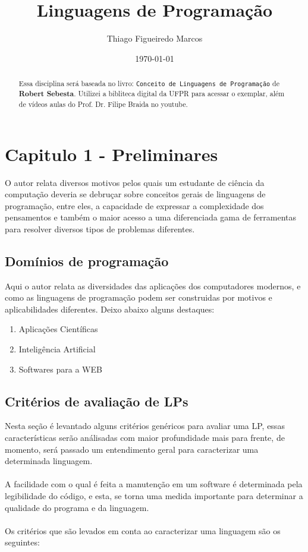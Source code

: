 \documentclass[12pt, onecolumn]{article}
\title{Linguagens de Programação}
\author{Thiago Figueiredo Marcos}
\date{\today}
\begin{document}
	\maketitle
	
	\begin{abstract}
		Essa disciplina será baseada no livro: \texttt{Conceito de 
		Linguagens de Programação} de \textbf{Robert Sebesta}. Utilizei
		a bibliteca digital da UFPR para acessar o exemplar, além de vídeos
		aulas do Prof. Dr. Filipe Braida no youtube.
	\end{abstract}


	\section{Capitulo 1 - Preliminares}
	O autor relata diversos motivos pelos quais um estudante de ciência da
	computação deveria se debruçar sobre conceitos gerais de linguagens de
	programação, entre eles, a capacidade de expressar a complexidade dos 
	pensamentos e também o maior acesso a uma diferenciada gama de ferramentas
	para resolver diversos tipos de problemas diferentes.
		
		\subsection{Domínios de programação}
		Aqui o autor relata as diversidades das aplicações dos 
		computadores modernos, e como as linguagens de programação
		podem ser construidas por motivos e aplicabilidades diferentes.
		Deixo abaixo alguns destaques: 

			\begin{enumerate}
				\item {Aplicações Científicas}
				\item {Inteligência Artificial}
				\item {Softwares para a WEB}
			\end{enumerate}

		\subsection{Critérios de avaliação de LPs}
		Nesta seção é levantado alguns critérios genéricos para 
		avaliar uma LP, essas características serão análisadas com
		maior profundidade mais para frente, de momento, será passado
		um entendimento geral para caracterizar uma determinada linguagem.\\
		\\
		A facilidade com o qual é feita a manutenção em um software é 
		determinada pela legibilidade do código, e esta, se torna uma medida 
		importante para determinar a qualidade do programa e da linguagem.\\
		\\
		Os critérios que são levados em conta ao caracterizar uma linguagem 
		são os seguintes: 
\end{document}
